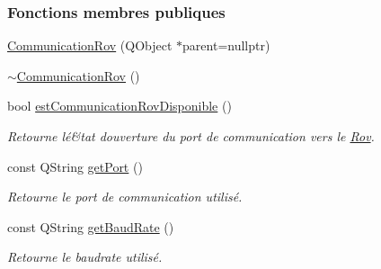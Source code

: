 \subsubsection*{Fonctions membres publiques}
\begin{DoxyCompactItemize}
\item 
\hyperlink{class_communication_rov_a22b64c69228d392a212f543e071adc02}{Communication\+Rov} (Q\+Object $\ast$parent=nullptr)
\item 
\hyperlink{class_communication_rov_a97e96f47dad6d47cbec4adc82756b49e}{$\sim$\+Communication\+Rov} ()
\item 
bool \hyperlink{class_communication_rov_a513c26b04745fa2ae31b4533d656dfd4}{est\+Communication\+Rov\+Disponible} ()
\begin{DoxyCompactList}\small\item\em Retourne l\textquotesingle{}é\&tat d\textquotesingle{}ouverture du port de communication vers le \hyperlink{class_rov}{Rov}. \end{DoxyCompactList}\item 
const Q\+String \hyperlink{class_communication_rov_a6226f9338fffc648cfca91c8e585a26b}{get\+Port} ()
\begin{DoxyCompactList}\small\item\em Retourne le port de communication utilisé. \end{DoxyCompactList}\item 
const Q\+String \hyperlink{class_communication_rov_a810de691dfc6d305f77c92ccd90bb6db}{get\+Baud\+Rate} ()
\begin{DoxyCompactList}\small\item\em Retourne le baudrate utilisé. \end{DoxyCompactList}\end{DoxyCompactItemize}
